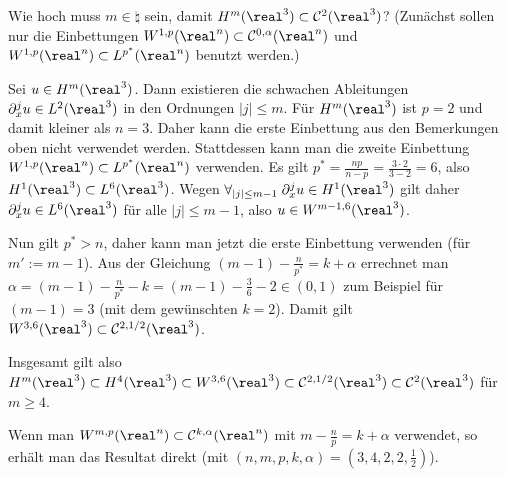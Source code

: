 \begin{Bsp}
    Wie hoch muss $m \in \natural$ sein, damit $H^m(\real^3) \subset \C^2(\real^3)$?
    (Zunächst sollen nur die Einbettungen $W^{1,p}(\real^n) \subset \C^{0,\alpha}(\real^n)$ und
    $W^{1,p}(\real^n) \subset L^{p^\ast}(\real^n)$ benutzt werden.)

    Sei $u \in H^m(\real^3)$.
    Dann existieren die schwachen Ableitungen $\partial_x^j u \in L^2(\real^3)$ in den Ordnungen
    $|j| \le m$.
    Für $H^m(\real^3)$ ist $p = 2$ und damit kleiner als $n = 3$.
    Daher kann die erste Einbettung aus den Bemerkungen oben nicht verwendet werden.
    Stattdessen kann man die zweite Einbettung $W^{1,p}(\real^n) \subset L^{p^\ast}(\real^n)$
    verwenden.
    Es gilt $p^\ast = \frac{np}{n - p} = \frac{3 \cdot 2}{3 - 2} = 6$,
    also $H^1(\real^3) \subset L^6(\real^3)$.
    Wegen $\forall_{|j| \le m-1}\; \partial_x^j u \in H^1(\real^3)$ gilt daher
    $\partial_x^j u \in L^6(\real^3)$ für alle $|j| \le m - 1$,
    also $u \in W^{m-1,6}(\real^3)$.

    Nun gilt $p^\ast > n$, daher kann man jetzt die erste Einbettung verwenden
    (für $m' := m - 1$).
    Aus der Gleichung $(m-1) - \frac{n}{p^\ast} = k + \alpha$ errechnet man
    $\alpha = (m-1) - \frac{n}{p^\ast} - k = (m-1) - \frac{3}{6} - 2 \in (0, 1)$
    zum Beispiel für $(m-1) = 3$ (mit dem gewünschten $k = 2$).
    Damit gilt $W^{3,6}(\real^3) \subset \C^{2,1/2}(\real^3)$.

    Insgesamt gilt also
    $H^m(\real^3) \subset H^4(\real^3) \subset W^{3,6}(\real^3) \subset \C^{2,1/2}(\real^3)
    \subset \C^2(\real^3)$ für $m \ge 4$.

    Wenn man $W^{m,p}(\real^n) \subset \C^{k,\alpha}(\real^n)$ mit $m - \frac{n}{p} = k + \alpha$
    verwendet, so erhält man das Resultat direkt
    (mit $(n, m, p, k, \alpha) = (3, 4, 2, 2, \frac{1}{2})$).
\end{Bsp}

\linie

